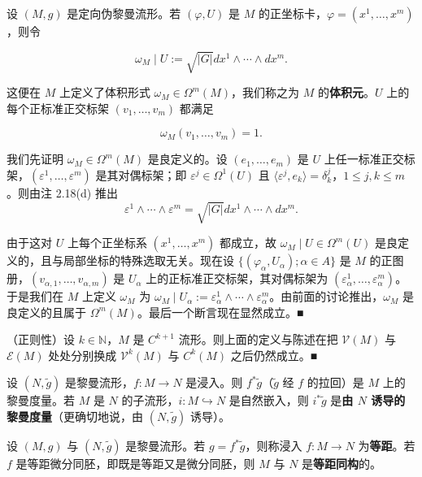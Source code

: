 \begin{remark}
\begin{items}
设 $ (M, g) $ 是定向伪黎曼流形。若 $ (\varphi, U) $ 是 $ M $ 的正坐标卡，$ \varphi = (x^{1}, \ldots, x^{m}) $，则令

\[
\omega_{M} \mid U := \sqrt{|G|} dx^{1} \wedge \cdots \wedge dx^{m} .
\]

这便在 $ M $ 上定义了体积形式 $ \omega_{M} \in \Omega^{m}(M) $，我们称之为 $ M $ 的\textbf{体积元}。$ U $ 上的每个正标准正交标架 $ (v_{1}, \ldots, v_{m}) $ 都满足

\[
\omega_{M}(v_{1}, \ldots, v_{m}) = 1 .
\]

\proofhead
我们先证明 $ \omega_{M} \in \Omega^{m}(M) $ 是良定义的。设 $ (e_{1}, \ldots, e_{m}) $ 是 $ U $ 上任一标准正交标架，$ (\varepsilon^{1}, \ldots, \varepsilon^{m}) $ 是其对偶标架；即 $ \varepsilon^{j} \in \Omega^{1}(U) $ 且 $ \langle \varepsilon^{j}, e_{k} \rangle = \delta^{j}_{k} $，$ 1 \le j, k \le m $。则由注 2.18(d) 推出
\[
\varepsilon^{1} \wedge \cdots \wedge \varepsilon^{m} = \sqrt{|G|} dx^{1} \wedge \cdots \wedge dx^{m} .
\]

由于这对 $ U $ 上每个正坐标系 $ (x^{1}, \ldots, x^{m}) $ 都成立，故 $ \omega_{M} \mid U \in \Omega^{m}(U) $ 是良定义的，且与局部坐标的特殊选取无关。现在设 $ \{(\varphi_{\alpha}, U_{\alpha}); \alpha \in A\} $ 是 $ M $ 的正图册，$ (v_{\alpha,1}, \ldots, v_{\alpha,m}) $ 是 $ U_{\alpha} $ 上的正标准正交标架，其对偶标架为 $ (\varepsilon^{1}_{\alpha}, \ldots, \varepsilon^{m}_{\alpha}) $。于是我们在 $ M $ 上定义 $ \omega_{M} $ 为 $ \omega_{M} \mid U_{\alpha} := \varepsilon^{1}_{\alpha} \wedge \cdots \wedge \varepsilon^{m}_{\alpha} $。由前面的讨论推出，$ \omega_{M} $ 是良定义的且属于 $ \Omega^{m}(M) $。最后一个断言现在显然成立。\nobreak\hspace{0.35em}■

\item

（正则性）设 $ k \in \mathbb{N} $，$ M $ 是 $ C^{k+1} $ 流形。则上面的定义与陈述在把 $ \mathcal{V}(M) $ 与 $ \mathcal{E}(M) $ 处处分别换成 $ \mathcal{V}^{k}(M) $ 与 $ C^{k}(M) $ 之后仍然成立。\nobreak\hspace{0.35em}■

\end{items}

设 $ (N, \tilde{g}) $ 是黎曼流形，$ f: M \to N $ 是浸入。则 $ f^{*}\tilde{g} $（$ \tilde{g} $ 经 $ f $ 的拉回）是 $ M $ 上的黎曼度量。若 $ M $ 是 $ N $ 的子流形，$ i: M \hookrightarrow N $ 是自然嵌入，则 $ i^{*}\tilde{g} $ 是\textbf{由 $ N $ 诱导的黎曼度量}（更确切地说，由 $ (N, \tilde{g}) $ 诱导）。

设 $ (M, g) $ 与 $ (N, \tilde{g}) $ 是黎曼流形。若 $ g = f^{*}\tilde{g} $，则称浸入 $ f: M \to N $ 为\textbf{等距}。若 $ f $ 是等距微分同胚，即既是等距又是微分同胚，则 $ M $ 与 $ N $ 是\textbf{等距同构}的。

\end{remark}

